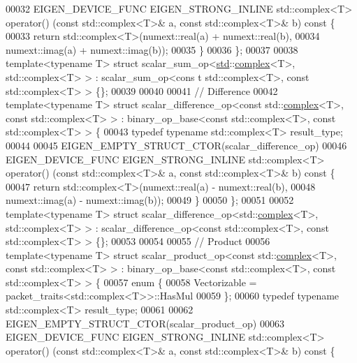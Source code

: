 \begin{DoxyCode}
00032   EIGEN\_DEVICE\_FUNC EIGEN\_STRONG\_INLINE std::complex<T> operator() (\textcolor{keyword}{const} std::complex<T>& a, \textcolor{keyword}{const} 
      std::complex<T>& b)\textcolor{keyword}{ const }\{
00033     \textcolor{keywordflow}{return} std::complex<T>(numext::real(a) + numext::real(b),
00034                            numext::imag(a) + numext::imag(b));
00035   \}
00036 \};
00037 
00038 \textcolor{keyword}{template}<\textcolor{keyword}{typename} T> \textcolor{keyword}{struct }scalar\_sum\_op<\hyperlink{namespacestd}{std}::\hyperlink{structcomplex}{complex}<T>, std::complex<T> > : scalar\_sum\_op<cons
      t std::complex<T>, const std::complex<T> > \{\};
00039 
00040 
00041 \textcolor{comment}{// Difference}
00042 \textcolor{keyword}{template}<\textcolor{keyword}{typename} T> \textcolor{keyword}{struct }scalar\_difference\_op<const std::\hyperlink{structcomplex}{complex}<T>, const std::complex<T> >  : 
      binary\_op\_base<const std::complex<T>, const std::complex<T> > \{
00043   \textcolor{keyword}{typedef} \textcolor{keyword}{typename} std::complex<T> result\_type;
00044 
00045   EIGEN\_EMPTY\_STRUCT\_CTOR(scalar\_difference\_op)
00046   EIGEN\_DEVICE\_FUNC EIGEN\_STRONG\_INLINE std::complex<T> operator() (\textcolor{keyword}{const} std::complex<T>& a, \textcolor{keyword}{const} 
      std::complex<T>& b)\textcolor{keyword}{ const }\{
00047     \textcolor{keywordflow}{return} std::complex<T>(numext::real(a) - numext::real(b),
00048                            numext::imag(a) - numext::imag(b));
00049   \}
00050 \};
00051 
00052 \textcolor{keyword}{template}<\textcolor{keyword}{typename} T> \textcolor{keyword}{struct }scalar\_difference\_op<std::\hyperlink{structcomplex}{complex}<T>, std::complex<T> > : 
      scalar\_difference\_op<const std::complex<T>, const std::complex<T> > \{\};
00053 
00054 
00055 \textcolor{comment}{// Product}
00056 \textcolor{keyword}{template}<\textcolor{keyword}{typename} T> \textcolor{keyword}{struct }scalar\_product\_op<const std::\hyperlink{structcomplex}{complex}<T>, const std::complex<T> >  : 
      binary\_op\_base<const std::complex<T>, const std::complex<T> > \{
00057   \textcolor{keyword}{enum} \{
00058     Vectorizable = packet\_traits<std::complex<T>>::HasMul
00059   \};
00060   \textcolor{keyword}{typedef} \textcolor{keyword}{typename} std::complex<T> result\_type;
00061 
00062   EIGEN\_EMPTY\_STRUCT\_CTOR(scalar\_product\_op)
00063   EIGEN\_DEVICE\_FUNC EIGEN\_STRONG\_INLINE std::complex<T> operator() (\textcolor{keyword}{const} std::complex<T>& a, \textcolor{keyword}{const} 
      std::complex<T>& b)\textcolor{keyword}{ const }\{

\end{DoxyCode}
